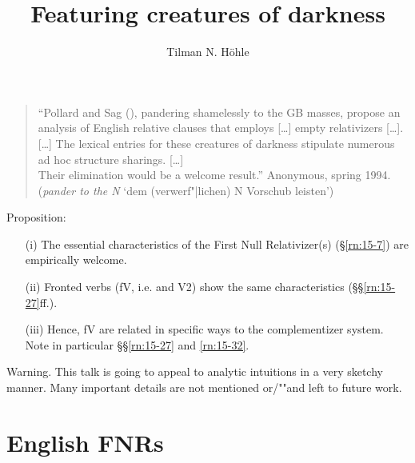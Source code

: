 \documentclass[output=paper]{LSP/langsci}
\author{Tilman N. Höhle}
\title{Featuring creatures of darkness}
\begin{document}
\label{chap-creatures}
\setcounter{randcount}{0}

\renewcommand*{\thefootnote}{\fnsymbol{footnote}}
\setcounter{footnote}{4}
\setcounter{footnote}{1}

\renewcommand*{\thefootnote}{\arabic{footnote}}
\setcounter{footnote}{0}

\begin{quotation}
``Pollard and Sag (\citeyear[Chapter~5]{PollardSag1994}), pandering shamelessly to the GB masses, propose an analysis of English relative clauses that employs [\ldots] empty relativizers [\ldots]. [\ldots] The lexical entries for these creatures of darkness stipulate numerous ad hoc structure sharings. [\ldots] \\  
Their elimination would be a welcome result.'' \hfill Anonymous, spring 1994. \\ (\textit{pander to the N} `dem (verwerf"|lichen) N  Vorschub leisten')
\end{quotation}
\randnum\label{rn:15-1}Proposition:
\begin{enumerate}
\item[(i)] The essential characteristics of the First Null Relativizer(s) (§\ref{rn:15-7}) are empirically welcome.
\item[(ii)] Fronted verbs (fV, i.e.  and V2) show the same characteristics (§§\ref{rn:15-27}ff.).
\item[(iii)] Hence, fV are related in specific ways to the complementizer system. Note in particular §§\ref{rn:15-27} and \ref{rn:15-32}.
\end{enumerate}
Warning.\randnum\label{rn:15-2} This talk is going to appeal to analytic intuitions in a very sketchy manner. Many important details are not mentioned or/""and left to future work.


\section{English FNRs}
\end{document}
